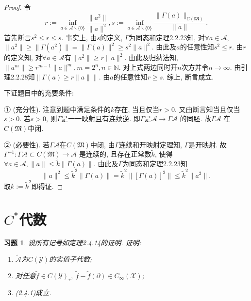 \documentclass[UTF8,twoside]{ctexbook}
\newtheorem{exercise}{习题}[section]
\newcommand{\h}{\mathscr}
\newcommand{\kx}{\mathbb}
\numberwithin{equation}{section}
\begin{document}
	\begin{proof}
		令
		\[
		r:=\inf_{a\in\h A\backslash\{0\}}\frac{\|a^2\|}{\|a\|^2}, s:=\inf_{a\in\h A\backslash\{0\}}\frac{\|\Gamma(a)\|_{C(\mathfrak M)}}{\|a\|}.
		\]
		首先断言$s^2\leq r\leq s$. 事实上, 由$s$的定义, $\Gamma$为同态和定理2.2.23知, 对$\forall a\in\h A$, $\|a^2\|\geq\|\Gamma(a^2)\|=\|\Gamma(a)\|^2\geq s^2\|a\|^2$. 由此及$a$的任意性知$s^2\leq r$. 由$r$的定义知, 对$\forall a\in\h A$有$\|a^2\|\geq r\|a\|^2$. 由此及归纳法知, $\|a^m\|\geq r^{m-1}\|a\|^m,m=2^n,n\in\kx N$. 对上式两边同时开$n$次方并令$n\rightarrow\infty$. 由引理2.2.28知$\|\Gamma(a)\geq r\|a\|\|$. 由$a$的任意性知$r\geq s$. 综上, 断言成立.

		下证题目中的充要条件:

		① (充分性). 注意到题中满足条件的$k$存在, 当且仅当$r>0$. 又由断言知当且仅当$s>0$. 若$s>0$, 则$\Gamma$是一一映射且有连续逆. 即$\Gamma$是$\h A\rightarrow\Gamma\h A$ 的同胚. 故$\Gamma\h A$ 在$C(\mathfrak M)$中闭.

		② (必要性). 若$\Gamma\h A$在$C(\mathfrak M)$中闭, 由$\Gamma$连续和开映射定理知, $\Gamma$是开映射. 故$\Gamma^{-1}:\Gamma\h A\subset C(\mathfrak M)\rightarrow\h A$ 是连续的, 且存在正常数$\widetilde k$, 使得$\forall a\in \h A,\|a\|\leq\widetilde k\|\Gamma(a)\|$. 由此及$\Gamma$为同态和定理2.2.23知
		\[
		\|a\|^2\leq\widetilde k^2\|\Gamma(a)\|=\widetilde k^2\|[\Gamma(a)]^2\|\leq\widetilde k^2\|a^2\|.
		\]
		取$k:=\widetilde k^2$即得证.
	\end{proof}
	\section{$C^*$代数}
	\begin{exercise}
		设所有记号如定理2.4.14的证明. 证明:
		\begin{enumerate}[(1)]
			\item$\widetilde{\h A}$为$C(\h Y)$的实值子代数;
			\item 对任意$\widetilde f\in C(\h Y)_r,\ \widetilde f-\widetilde f(\partial)\in C_\infty(\h X)$;
			\item (2.4.1)成立.
		\end{enumerate}
	\end{exercise}
\end{document}

